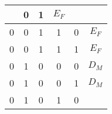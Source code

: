 \begin{table}[!htb]
\begin{tabular}{|ccccc|c|}
                                  & {\color[HTML]{00009B} 0}                                    & {\color[HTML]{00009B} 1}                            
 
       & {\color[HTML]{FE0000} $E_F$}                                     \\ \hline
{\color[HTML]{00009B} 0}                                   & {\color[HTML]{00009B} 0}                                    & {\color[HTML]{00009B} 1}   
 
                                & {\color[HTML]{00009B} 1}                                    & {\color[HTML]{00009B} 0}                              
 
     & {\color[HTML]{FE0000} $E_F$}                                     \\ \hline
{\color[HTML]{00009B} 0}                                    & {\color[HTML]{00009B} 0}                                  & {\color[HTML]{00009B} 1}    
 
                               & {\color[HTML]{00009B} 1}                                    & {\color[HTML]{00009B} 1}                               
 
    & {\color[HTML]{FE0000} $E_F$}                                     \\ \hline
{\color[HTML]{00009B} 0}                                     & {\color[HTML]{00009B} 1}                                    & {\color[HTML]{00009B} 0} 
 
                                & {\color[HTML]{00009B} 0}                                    & {\color[HTML]{00009B} 0}                              
 
     & {\color[HTML]{FE0000} $D_M$}                                     \\ \hline
{\color[HTML]{00009B} 0}                                    & {\color[HTML]{00009B} 1}                                    & {\color[HTML]{00009B} 0}  
 
                                 & {\color[HTML]{00009B} 0}                                 & {\color[HTML]{00009B} 1}                                
 
   & {\color[HTML]{FE0000} $D_M$}                                     \\ \hline
{\color[HTML]{00009B} 0}                                    & {\color[HTML]{00009B} 1}                                    & {\color[HTML]{00009B} 0}  
 
                                 & {\color[HTML]{00009B} 1}                                    & {\color[HTML]{00009B} 0}                             
 

\end{tabular}
\end{table}
